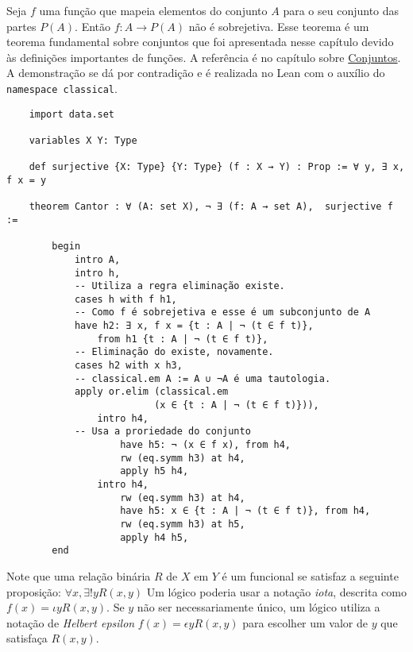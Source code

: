 \begin{example}
    \label{cantor}
    Seja $f$ uma função que mapeia elementos do conjunto $A$ para o seu
    conjunto das partes $P(A)$. Então $f: A \to P(A)$ não é sobrejetiva. Esse
    teorema é um teorema fundamental sobre conjuntos que foi apresentada nesse
    capítulo devido às definições importantes de funções. A referência é no
    capítulo sobre \hyperlink{chapter.5}{Conjuntos}. A demonstração se dá por
    contradição e é realizada no Lean com o auxílio do 
    \lstinline{namespace classical}. 

    \begin{lstlisting}
    import data.set

    variables X Y: Type 
    
    def surjective {X: Type} {Y: Type} (f : X → Y) : Prop := ∀ y, ∃ x, f x = y
    
    theorem Cantor : ∀ (A: set X), ¬ ∃ (f: A → set A),  surjective f :=
    
        begin
            intro A,
            intro h,
            -- Utiliza a regra eliminação existe.
            cases h with f h1,
            -- Como f é sobrejetiva e esse é um subconjunto de A            
            have h2: ∃ x, f x = {t : A | ¬ (t ∈ f t)},  
                from h1 {t : A | ¬ (t ∈ f t)},
            -- Eliminação do existe, novamente. 
            cases h2 with x h3,
            -- classical.em A := A ∪ ¬A é uma tautologia. 
            apply or.elim (classical.em 
                          (x ∈ {t : A | ¬ (t ∈ f t)})),
                intro h4,
            -- Usa a proriedade do conjunto
                    have h5: ¬ (x ∈ f x), from h4,
                    rw (eq.symm h3) at h4, 
                    apply h5 h4,
                intro h4,
                    rw (eq.symm h3) at h4,
                    have h5: x ∈ {t : A | ¬ (t ∈ f t)}, from h4,
                    rw (eq.symm h3) at h5,
                    apply h4 h5,                     
        end   
    \end{lstlisting}
\end{example}

Note que uma relação binária $R$ de $X$ em $Y$ é um funcional se satisfaz a
seguinte proposição:
\begin{math}
    \forall x, \exists! y R(x,y) 
\end{math}
Um lógico poderia usar a notação \textit{iota}, descrita como $f(x) = \iota y
R(x,y)$. Se $y$ não ser necessariamente único, um lógico utiliza a notação de
\textit{Helbert epsilon} $f(x) = \epsilon y R(x,y)$ para escolher um valor de
$y$ que satisfaça $R(x,y)$.

